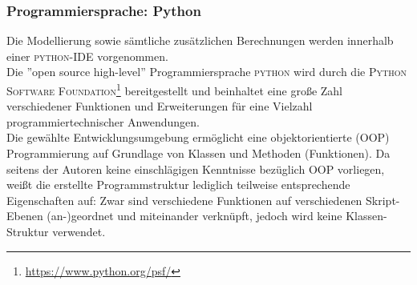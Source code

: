 \documentclass[onecolumn,10pt,titlepage]{article}
\begin{document}
\subsubsection{Programmiersprache: Python}
Die Modellierung sowie sämtliche zusätzlichen Berechnungen werden innerhalb einer \textsc{python}-IDE vorgenommen.\\
Die ''open source high-level'' Programmiersprache \textsc{python} wird durch die \textsc{Python Software Foundation\footnote{\url{https://www.python.org/psf/}}} bereitgestellt und beinhaltet eine große Zahl verschiedener Funktionen und Erweiterungen für eine Vielzahl programmiertechnischer Anwendungen.\\
Die gewählte Entwicklungsumgebung ermöglicht eine objektorientierte (OOP) Programmierung auf Grundlage von Klassen und Methoden (Funktionen).
Da seitens der Autoren keine einschlägigen Kenntnisse bezüglich OOP vorliegen, weißt die erstellte Programmstruktur lediglich teilweise entsprechende Eigenschaften auf: Zwar sind verschiedene Funktionen auf verschiedenen Skript-Ebenen (an-)geordnet und miteinander verknüpft, jedoch wird keine Klassen-Struktur verwendet. 


\end{document}

